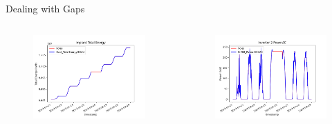 \begin{frame}{Dealing with Gaps}
	\begin{columns}
		\begin{figure}
			\centering
			\includegraphics[width=\textwidth]{sections/2_preprocessing/imgs/totenergybuco2.png}
		\end{figure}
		\begin{figure}
			\centering
			\includegraphics[width=\textwidth]{sections/2_preprocessing/imgs/inv02powerbuco2.png}
		\end{figure}
	\end{columns}
\end{frame}